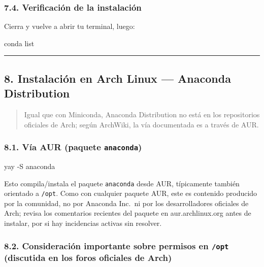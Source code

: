 \documentclass[
  doc,
  floatsintext,
  longtable,
  a4paper,
  nolmodern,
  notxfonts,
  notimes,
  12pt,
  colorlinks=true,linkcolor=blue,citecolor=blue,urlcolor=blue]{apa7}
\newenvironment{Shaded}{\begin{snugshade}}{\end{snugshade}}
\newcommand{\AttributeTok}[1]{\textcolor[rgb]{0.40,0.45,0.13}{#1}}
\newcommand{\ExtensionTok}[1]{\textcolor[rgb]{0.00,0.23,0.31}{#1}}
\newcommand{\NormalTok}[1]{\textcolor[rgb]{0.00,0.23,0.31}{#1}}
\begin{document}
\subsubsection{7.4. Verificación de la
instalación}\label{verificaciuxf3n-de-la-instalaciuxf3n}

Cierra y vuelve a abrir tu terminal, luego:

\begin{Shaded}
\begin{Highlighting}[]
\ExtensionTok{conda}\NormalTok{ list}
\end{Highlighting}
\end{Shaded}

\begin{center}\rule{0.5\linewidth}{0.5pt}\end{center}

\subsection{8. Instalación en Arch Linux --- Anaconda
Distribution}\label{instalaciuxf3n-en-arch-linux-anaconda-distribution}

\begin{quote}
Igual que con Miniconda, Anaconda Distribution no está en los
repositorios oficiales de Arch; según ArchWiki, la vía documentada es a
través de AUR.
\end{quote}

\subsubsection{\texorpdfstring{8.1. Vía AUR (paquete
\texttt{anaconda})}{8.1. Vía AUR (paquete anaconda)}}\label{vuxeda-aur-paquete-anaconda}

\begin{Shaded}
\begin{Highlighting}[]
\ExtensionTok{yay} \AttributeTok{{-}S}\NormalTok{ anaconda}
\end{Highlighting}
\end{Shaded}

Esto compila/instala el paquete \texttt{anaconda} desde AUR, típicamente
también orientado a \texttt{/opt}. Como con cualquier paquete AUR, este
es contenido producido por la comunidad, no por Anaconda Inc.~ni por los
desarrolladores oficiales de Arch; revisa los comentarios recientes del
paquete en aur.archlinux.org antes de instalar, por si hay incidencias
activas sin resolver.

\subsubsection{\texorpdfstring{8.2. Consideración importante sobre
permisos en \texttt{/opt} (discutida en los foros oficiales de
Arch)}{8.2. Consideración importante sobre permisos en /opt (discutida en los foros oficiales de Arch)}}\label{consideraciuxf3n-importante-sobre-permisos-en-opt-discutida-en-los-foros-oficiales-de-arch}
\end{document}
